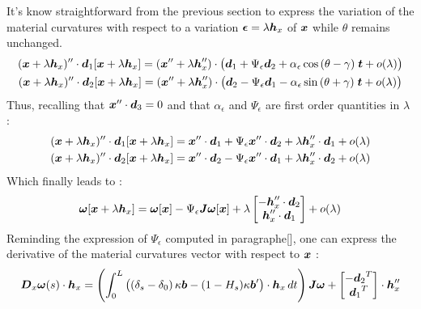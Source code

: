 It's know straightforward from the previous section to express the variation of the material curvatures with respect to a variation $\boldsymbol{\epsilon} =\lambda \boldsymbol{h}_x$ of $\boldsymbol{x}$ while $\theta$ remains unchanged.
\begin{subequations}
	\begin{gather}
		(\boldsymbol{x}+\lambda \boldsymbol{h}_x)'' \cdot \boldsymbol{d}_1[\boldsymbol{x}+\lambda \boldsymbol{h}_x] =
			(\boldsymbol{x}''+\lambda \boldsymbol{h}_x'')\cdot\big(\boldsymbol{d}_1 + \Psi_\epsilon\boldsymbol{d}_2
			+ \alpha_\epsilon\cos{(\theta-\gamma)}\;\boldsymbol{t} + o(\lambda)\big) \\
		(\boldsymbol{x}+\lambda \boldsymbol{h}_x)'' \cdot \boldsymbol{d}_2[\boldsymbol{x}+\lambda \boldsymbol{h}_x] =
			(\boldsymbol{x}''+\lambda \boldsymbol{h}_x'')\cdot\big(\boldsymbol{d}_2 - \Psi_\epsilon\boldsymbol{d}_1
			- \alpha_\epsilon\sin{(\theta+\gamma)}\;\boldsymbol{t} + o(\lambda)\big)
		\end{gather}
\end{subequations}
Thus, recalling that $\boldsymbol{x}''\cdot\boldsymbol{d}_3 = 0$ and that $\alpha_\epsilon$ and $\Psi_\epsilon$ are first order quantities in $\lambda$ :
\begin{subequations}
	\begin{gather}
		(\boldsymbol{x}+\lambda \boldsymbol{h}_x)'' \cdot \boldsymbol{d}_1[\boldsymbol{x}+\lambda \boldsymbol{h}_x] = 					\boldsymbol{x}''\cdot\boldsymbol{d}_1 + \Psi_\epsilon\boldsymbol{x}''\cdot\boldsymbol{d}_2 + \lambda \boldsymbol{h}_x''\cdot\boldsymbol{d}_1 + o(\lambda)\\
		(\boldsymbol{x}+\lambda \boldsymbol{h}_x)'' \cdot \boldsymbol{d}_2[\boldsymbol{x}+\lambda \boldsymbol{h}_x] =
				\boldsymbol{x}''\cdot\boldsymbol{d}_2 - \Psi_\epsilon\boldsymbol{x}''\cdot\boldsymbol{d}_1 +  \lambda \boldsymbol{h}_x''\cdot\boldsymbol{d}_2 + o(\lambda)
	\end{gather}
\end{subequations}
Which finally leads to :
\begin{equation}
		\boldsymbol{\omega}[\boldsymbol{x}+\lambda \boldsymbol{h}_x]  =
		\boldsymbol{\omega}[\boldsymbol{x}] - \Psi_\epsilon\boldsymbol{\mathit{J}}\boldsymbol{\omega}[\boldsymbol{x}]+\lambda
		\begin{bmatrix}
			-\boldsymbol{h}_x''\cdot\boldsymbol{d}_2\\
			\boldsymbol{h}_x''\cdot\boldsymbol{d}_1\\
		\end{bmatrix} + o(\lambda)
\end{equation}
Reminding the expression of $\Psi_\epsilon$ computed in paragraphe[], one can express the derivative of the material curvatures vector with respect to $\boldsymbol{x}$ :
\begin{equation}
			\boldsymbol{D}_x\boldsymbol{\omega}(s)\cdot\boldsymbol{h}_x
	= 	\left(\int_0^L \left(\left(\delta_s-\delta_0\right)\kappa\boldsymbol{b} - (1-H_s)\kappa\boldsymbol{b}'\right)\cdot  \boldsymbol{h}_x \,dt\right)\boldsymbol{\mathit{J}}\boldsymbol{\omega}+
		\begin{bmatrix}
			-{\boldsymbol{d}_2}^T\\
			{\boldsymbol{d}_1}^T\\
		\end{bmatrix}\cdot \boldsymbol{h}_x''
\end{equation}



